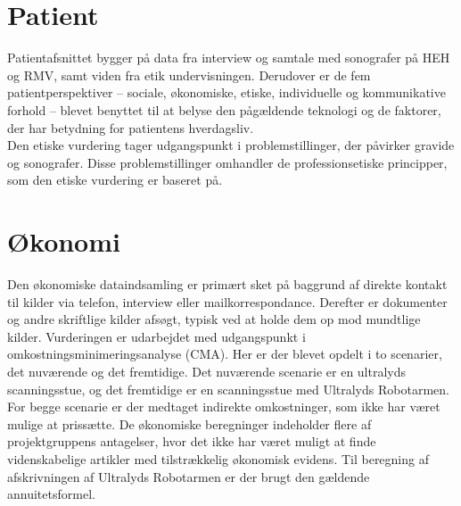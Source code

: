 \section{Patient}
Patientafsnittet bygger på data fra interview og samtale med sonografer på HEH og RMV, samt viden fra etik undervisningen. Derudover er de fem patientperspektiver – sociale, økonomiske, etiske, individuelle og kommunikative forhold – blevet benyttet til at belyse den pågældende teknologi og de faktorer, der har betydning for patientens hverdagsliv.\\ 
Den etiske vurdering tager udgangspunkt i problemstillinger, der påvirker gravide og sonografer. Disse problemstillinger omhandler de professionsetiske principper, som den etiske vurdering er baseret på.

\section{Økonomi}
Den økonomiske dataindsamling er primært sket på baggrund af direkte kontakt til kilder via telefon, interview eller mailkorrespondance. Derefter er dokumenter og andre skriftlige kilder afsøgt, typisk ved at holde dem op mod mundtlige kilder. Vurderingen er udarbejdet med udgangspunkt i omkostningsminimeringsanalyse (CMA). Her er der blevet opdelt i to scenarier, det nuværende og det fremtidige. Det nuværende scenarie er en ultralyds scanningsstue, og det fremtidige er en scanningsstue med Ultralyds Robotarmen. For begge scenarie er der medtaget indirekte omkostninger, som ikke har været mulige at prissætte. De økonomiske beregninger indeholder flere af projektgruppens antagelser, hvor det ikke har været muligt at finde videnskabelige artikler med tilstrækkelig økonomisk evidens. Til beregning af afskrivningen af Ultralyds Robotarmen er der brugt den gældende annuitetsformel. 